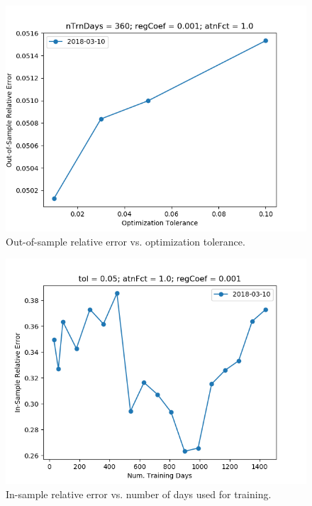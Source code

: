 \documentclass{article}
\begin{document}
\begin{figure}\label{fig:tolerance-sensitivity-oos-error}
\includegraphics[bb=0 0 640 480]{figures/tolerance-sensitivity-oos-error.png}
\caption{Out-of-sample relative error vs. optimization tolerance.}
\end{figure}

\begin{figure}\label{fig:nTrnDays-sensitivity-error}
\includegraphics[bb=0 0 640 480]{figures/nTrnDays-sensitivity-error.png}
\caption{In-sample relative error vs. number of days used for training.}
\end{figure}
\end{document}
